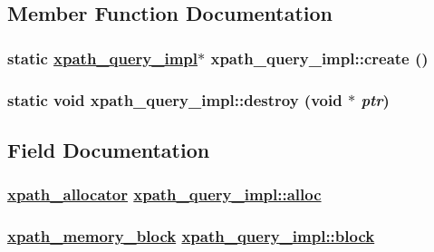 \subsection{Member Function Documentation}
\hypertarget{structxpath__query__impl_fcf45bb9a20a4117b1e963d83277aa7f}{
\subsubsection[create]{\setlength{\rightskip}{0pt plus 5cm}static \hyperlink{structxpath__query__impl}{xpath\_\-query\_\-impl}$\ast$ xpath\_\-query\_\-impl::create ()}}
\label{structxpath__query__impl_fcf45bb9a20a4117b1e963d83277aa7f}


\hypertarget{structxpath__query__impl_9b7194b1356cca3f3b62f4cdb8d8960f}{
\subsubsection[destroy]{\setlength{\rightskip}{0pt plus 5cm}static void xpath\_\-query\_\-impl::destroy (void $\ast$ {\em ptr})}}
\label{structxpath__query__impl_9b7194b1356cca3f3b62f4cdb8d8960f}




\subsection{Field Documentation}
\hypertarget{structxpath__query__impl_e568b8642d48e729f2ccc2a50467c847}{
\subsubsection[alloc]{\setlength{\rightskip}{0pt plus 5cm}\hyperlink{classxpath__allocator}{xpath\_\-allocator} \hyperlink{structxpath__query__impl_e568b8642d48e729f2ccc2a50467c847}{xpath\_\-query\_\-impl::alloc}}}
\label{structxpath__query__impl_e568b8642d48e729f2ccc2a50467c847}


\hypertarget{structxpath__query__impl_3a8af3ceed6a504567656ec6d1b62641}{
\subsubsection[block]{\setlength{\rightskip}{0pt plus 5cm}\hyperlink{structxpath__memory__block}{xpath\_\-memory\_\-block} \hyperlink{structxpath__query__impl_3a8af3ceed6a504567656ec6d1b62641}{xpath\_\-query\_\-impl::block}}}
\label{structxpath__query__impl_3a8af3ceed6a504567656ec6d1b62641}


